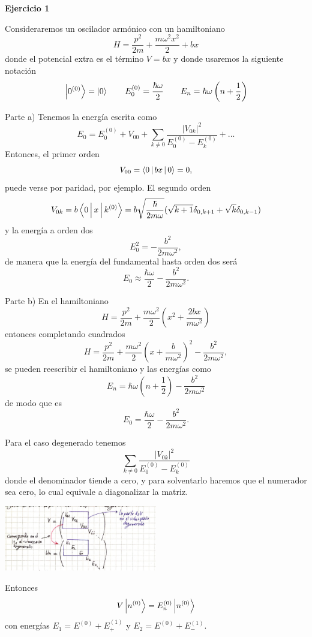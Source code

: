 \documentclass[10pt,oneside]{CBFT_book}
\begin{document}
\begin{ejemplo}{\bf Ejercicio 1}

Consideraremos un oscilador armónico con un hamiltoniano
\[
	H = \frac{p^2}{2m} + \frac{m \omega^2 x^2}{2} + b x
\]
donde el potencial extra es el término $V = bx$ y donde usaremos la siguiente notación
\[
	\Ket{0^{(0)}} = \Ket{0} 
	\qquad 
	E_0^{(0)} = \frac{\hbar \omega}{2}
	\qquad 
	E_n = \hbar \omega \left( n + \frac{1}{2} \right)
\]

Parte a)
Tenemos la energía escrita como
\[
	E_0 = E_0^{(0)} + V_{00} + \sum_{k\neq 0} \frac{|V_{0k}|^2}{ E_0^{(0)} - E_k^{(0)}} + ...
\]
Entonces, el primer orden
\[
	V_{00} = \Braket{ 0 | bx | 0} = 0,
\]
puede verse por paridad, por ejemplo.
El segundo orden
\[
	V_{0k} = b\Braket{0|x|k^{(0)}} =
	b \sqrt{\frac{\hbar}{2 m \omega}} ( \sqrt{k+1} \delta_{0,k+1} + \sqrt{k} \delta_{0,k-1} )
\]
y la energía a orden dos
\[
	E_0^{2} = -\frac{b^2}{2 m \omega^2},
\]
de manera que la energía del fundamental hasta orden dos será
\[
	E_0 \approx \frac{\hbar \omega}{2} -\frac{b^2}{2 m \omega^2}.
\]

Parte b)
En el hamiltoniano
\[
	H = \frac{p^2}{2m} + \frac{m \omega^2 }{2} \left( x^2 + \frac{ 2 b x }{m \omega^2} \right)
\]
entonces completando cuadrados
\[
	H = \frac{p^2}{2m} + \frac{m \omega^2 }{2} \left( x + \frac{ b }{m \omega^2} \right)^2 
	- \frac{b^2}{2 m \omega^2},
\]
se pueden reescribir el hamiltoniano y las energías como
\[
	E_n = \hbar \omega \left( n + \frac{1}{2} \right) - \frac{b^2}{2 m \omega^2}
\]
de modo que es 
\[
	E_0 = \frac{\hbar \omega}{2} -\frac{b^2}{2 m \omega^2}.
\]

Para el caso degenerado tenemos 
\[
	 \sum_{k\neq 0} \frac{|V_{0k}|^2}{ E_0^{(0)} - E_k^{(0)}}
\]
donde el denominador tiende a cero, y para solventarlo haremos que el numerador sea cero, lo cual
equivale a diagonalizar la matriz.

\includegraphics[width=0.5\textwidth]{images/fig_ft2_diagonalizacion.jpg}

Entonces
\[
	V \Ket{n^{(0)}} = E^{(0)}_n \Ket{ n^{(0)} }
\]
con energías $E_1 = E^{(0)} + E^{(1)}_+$ y $E_2 = E^{(0)} + E^{(1)}_-$.
 
\end{ejemplo}
\end{document}
